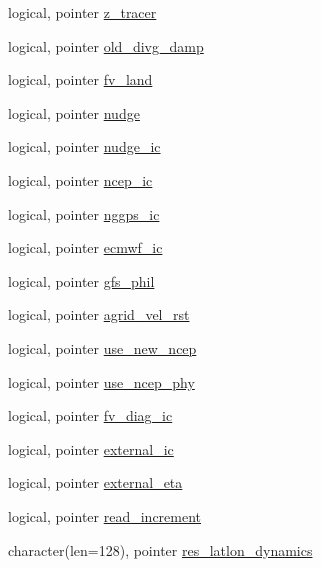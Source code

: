 \begin{DoxyCompactItemize}
\item 
logical, pointer \hyperlink{classfv__control__mod_af47884ffb9df2d7a1ef46cad26ef3c14}{z\-\_\-tracer}
\item 
logical, pointer \hyperlink{classfv__control__mod_a32a2ea4bdec1e069f6461fb5b1471d93}{old\-\_\-divg\-\_\-damp}
\item 
logical, pointer \hyperlink{classfv__control__mod_af4c314c13b9fc726587ce6b016ea4e91}{fv\-\_\-land}
\item 
logical, pointer \hyperlink{classfv__control__mod_a07a467d55363147e21ffdb90196521c5}{nudge}
\item 
logical, pointer \hyperlink{classfv__control__mod_acf381938c799f3bf387b28c9a5d2e06c}{nudge\-\_\-ic}
\item 
logical, pointer \hyperlink{classfv__control__mod_aff372420df2393f8cf3582a9ed117a1c}{ncep\-\_\-ic}
\item 
logical, pointer \hyperlink{classfv__control__mod_a6b8b8e887c41c9b275875bf1e24f17a4}{nggps\-\_\-ic}
\item 
logical, pointer \hyperlink{classfv__control__mod_a2c5506c3c86aaa2ea7ee7e7db98f6f03}{ecmwf\-\_\-ic}
\item 
logical, pointer \hyperlink{classfv__control__mod_a23d51351494286e342a9ff3f808254f0}{gfs\-\_\-phil}
\item 
logical, pointer \hyperlink{classfv__control__mod_ad0db04a64c5ffb2ae0e4b4baed552dec}{agrid\-\_\-vel\-\_\-rst}
\item 
logical, pointer \hyperlink{classfv__control__mod_a02a42143570e966aa1c87122b8d6e49a}{use\-\_\-new\-\_\-ncep}
\item 
logical, pointer \hyperlink{classfv__control__mod_a79bd1445421e88a4b7a21af6745a7dd3}{use\-\_\-ncep\-\_\-phy}
\item 
logical, pointer \hyperlink{classfv__control__mod_ac1952fa035cb6a71f7a72eb765c36ca6}{fv\-\_\-diag\-\_\-ic}
\item 
logical, pointer \hyperlink{classfv__control__mod_a98a28143f20b09d0d461a3378cce066c}{external\-\_\-ic}
\item 
logical, pointer \hyperlink{classfv__control__mod_a0457568f23f81b319e4000137cb85cd2}{external\-\_\-eta}
\item 
logical, pointer \hyperlink{classfv__control__mod_a3a2a138b7e1dcfd1f7bd0e2bda7a2ebf}{read\-\_\-increment}
\item 
character(len=128), pointer \hyperlink{classfv__control__mod_a39dbf978496637d0fc8949fa68cd3b17}{res\-\_\-latlon\-\_\-dynamics}
\item 

\end{DoxyCompactItemize}
